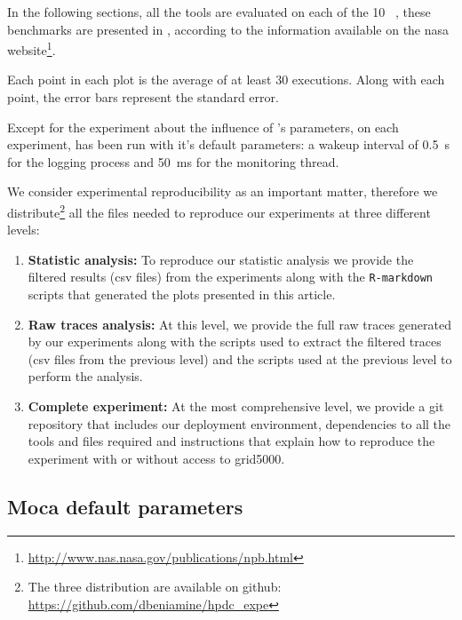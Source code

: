
In the following sections, all the tools are
evaluated on each of the 10 \NPB~\cite{Jin1999}, these benchmarks are
presented in , according to the information available on the nasa
website\footnote{\url{http://www.nas.nasa.gov/publications/npb.html}}.

Each point in each plot is the average of at least $30$ executions. Along with each point,
the error bars represent the standard error.

Except for the experiment about the influence of \Moca's parameters, on each
experiment, \Moca has been run with it's default parameters: a wakeup interval of
\SI{0.5}{s} for the logging process and \SI{50}{ms} for the monitoring thread.

We consider experimental reproducibility as an important matter, therefore we
distribute\footnote{The three distribution are available on github:\\
    \url{https://github.com/dbeniamine/hpdc_expe}}
all the files needed to reproduce our experiments at three different levels:

\begin{enumerate}
    \item \textbf{Statistic analysis:} To reproduce our statistic analysis we provide
        the filtered results (csv files) from the experiments along with the
        \texttt{R-markdown} scripts that generated the plots presented in this
        article.
    \item \textbf{Raw traces analysis:} At this level, we provide the full raw traces
        generated by our experiments along with the scripts used to extract the
        filtered traces (csv files from the previous level) and the scripts used
	at the previous level to perform the analysis.
    \item \textbf{Complete experiment:} At the most comprehensive level, we provide a git
        repository that includes our deployment environment, dependencies to all the
        tools and files required and instructions that explain how
        to reproduce the experiment with or without access to grid5000.
\end{enumerate}


\subsection{Moca default parameters}
\label{sec:expe-param}

